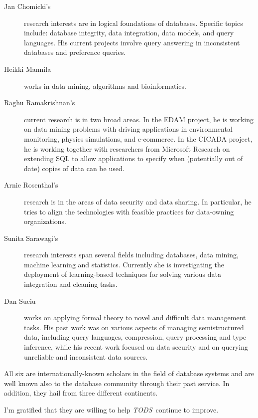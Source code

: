 \documentclass[11pt]{article}
\newcommand{\tods}{{\em TODS\/}}
\begin{document}
\begin{description}
\item[Jan Chomicki's] research interests are in logical foundations of
databases.  Specific topics include: database integrity, data integration,
data models, and query languages. His current projects involve query
answering in inconsistent databases and preference queries.

\item[Heikki Mannila] works in data mining, algorithms and bioinformatics.

\item[Raghu Ramakrishnan's] current research is in two broad areas. In the EDAM
project, he is working on data mining problems with driving applications in
environmental monitoring, physics simulations, and e-commerce.  In the
CICADA project, he is working together with researchers from Microsoft
Research on extending SQL to allow applications to specify when (potentially
out of date) copies of data can be used.

\item[Arnie Rosenthal's] research is in the areas of data security and data
sharing. In particular, he tries to align the technologies with feasible
practices for data-owning organizations.

\item[Sunita Sarawagi's] research interests span several fields including 
databases, data mining, machine learning and statistics.  Currently she 
is investigating the deployment of learning-based techniques for solving 
various data integration and cleaning tasks.

\item[Dan Suciu] works on applying formal theory to novel and difficult data 
management tasks.  His past work was on various aspects of managing 
semistructured data, including query languages, compression, query 
processing and type inference, while his recent work focused on data 
security and on querying unreliable and inconsistent data sources.
\end{description}

\noindent
All six are internationally-known scholars in the field of
database systems and are well known also to the database community
through their past service. In addition, they hail from three different
continents.

I'm gratified that they are willing to help \tods\ continue to improve.
\end{document}

